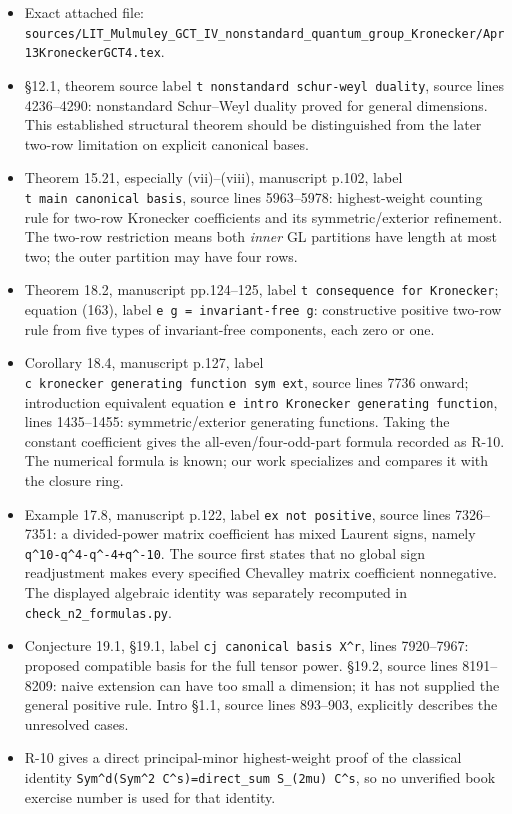 \documentclass[11pt,a4paper]{article}
\providecommand{\tightlist}{\setlength{\itemsep}{0pt}\setlength{\parskip}{0pt}}
\theoremstyle{definition}\newtheorem{definition}{Definition}
\begin{document}
\begin{itemize}
\tightlist
\item
  Exact attached file:
  \nolinkurl{sources/LIT_Mulmuley_GCT_IV_nonstandard_quantum_group_Kronecker/Apr13KroneckerGCT4.tex}.
\item
  §12.1, theorem source label
  \texttt{t\ nonstandard\ schur-weyl\ duality}, source lines 4236--4290:
  nonstandard Schur--Weyl duality proved for general dimensions. This
  established structural theorem should be distinguished from the later
  two-row limitation on explicit canonical bases.
\item
  Theorem 15.21, especially (vii)--(viii), manuscript p.102, label
  \texttt{t\ main\ canonical\ basis}, source lines 5963--5978:
  highest-weight counting rule for two-row Kronecker coefficients and
  its symmetric/exterior refinement. The two-row restriction means both
  \emph{inner} GL partitions have length at most two; the outer
  partition may have four rows.
\item
  Theorem 18.2, manuscript pp.124--125, label
  \texttt{t\ consequence\ for\ Kronecker}; equation (163), label
  \texttt{e\ g\ =\ invariant-free\ g}: constructive positive two-row
  rule from five types of invariant-free components, each zero or one.
\item
  Corollary 18.4, manuscript p.127, label
  \texttt{c\ kronecker\ generating\ function\ sym\ ext}, source lines
  7736 onward; introduction equivalent equation
  \texttt{e\ intro\ Kronecker\ generating\ function}, lines 1435--1455:
  symmetric/exterior generating functions. Taking the constant
  coefficient gives the all-even/four-odd-part formula recorded as R-10.
  The numerical formula is known; our work specializes and compares it
  with the closure ring.
\item
  Example 17.8, manuscript p.122, label \texttt{ex\ not\ positive},
  source lines 7326--7351: a divided-power matrix coefficient has mixed
  Laurent signs, namely \texttt{q\^{}10-q\^{}4-q\^{}-4+q\^{}-10}. The
  source first states that no global sign readjustment makes every
  specified Chevalley matrix coefficient nonnegative. The displayed
  algebraic identity was separately recomputed in
  \nolinkurl{check_n2_formulas.py}.
\item
  Conjecture 19.1, §19.1, label \texttt{cj\ canonical\ basis\ X\^{}r},
  lines 7920--7967: proposed compatible basis for the full tensor power.
  §19.2, source lines 8191--8209: naive extension can have too small a
  dimension; it has not supplied the general positive rule. Intro §1.1,
  source lines 893--903, explicitly describes the unresolved cases.
\item
  R-10 gives a direct principal-minor highest-weight proof of the
  classical identity
  \texttt{Sym\^{}d(Sym\^{}2\ C\^{}s)=direct\_sum\ S\_(2mu)\ C\^{}s}, so
  no unverified book exercise number is used for that identity.
\end{itemize}
\end{document}
